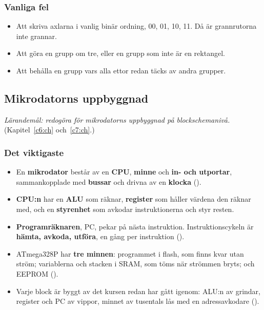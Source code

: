 \subsubsection{Vanliga fel}
\begin{itemize}
  \item Att skriva axlarna i vanlig binär ordning, 00, 01, 10, 11. Då är grannrutorna inte
    grannar.
  \item Att göra en grupp om tre, eller en grupp som inte är en rektangel.
  \item Att behålla en grupp vars alla ettor redan täcks av andra grupper.
\end{itemize}

\subsection{Mikrodatorns uppbyggnad}
\label{c12:a5}
\emph{Lärandemål: redogöra för mikrodatorns uppbyggnad på blockschemanivå.}
(Kapitel~\ref{c6:ch} och~\ref{c7:ch}.)

\subsubsection{Det viktigaste}
\begin{itemize}
  \item En \textbf{mikrodator} består av en \textbf{CPU}, \textbf{minne} och \textbf{in- och
    utportar}, sammankopplade med \textbf{bussar} och drivna av en \textbf{klocka}
    ().
  \item \textbf{CPU:n} har en \textbf{ALU} som räknar, \textbf{register} som håller värdena den
    räknar med, och en \textbf{styrenhet} som avkodar instruktionerna och styr resten.
  \item \textbf{Programräknaren}, PC, pekar på nästa instruktion. Instruktionscykeln är
    \textbf{hämta, avkoda, utföra}, en gång per instruktion ().
  \item ATmega328P har \textbf{tre minnen}: programmet i flash, som finns kvar utan ström;
    variablerna och stacken i SRAM, som töms när strömmen bryts; och EEPROM ().
  \item Varje block är byggt av det kursen redan har gått igenom: ALU:n av grindar, register och PC
    av vippor, minnet av tusentals lås med en adressavkodare ().
\end{itemize}

